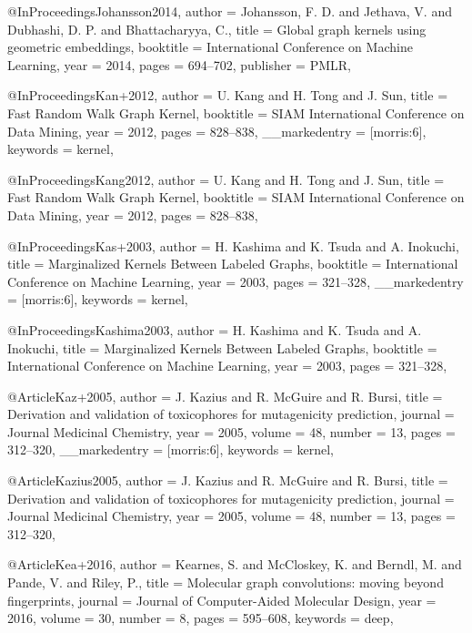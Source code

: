 @InProceedings{Johansson2014,
  author    = {Johansson, F. D. and Jethava, V. and Dubhashi, D. P. and Bhattacharyya, C.},
  title     = {Global graph kernels using geometric embeddings},
  booktitle = {International Conference on Machine Learning},
  year      = {2014},
  pages     = {694--702},
  publisher = {PMLR},
}

@InProceedings{Kan+2012,
  author        = {U. Kang and H. Tong and J. Sun},
  title         = {Fast Random Walk Graph Kernel},
  booktitle     = {SIAM International Conference on Data Mining},
  year          = {2012},
  pages         = {828--838},
  __markedentry = {[morris:6]},
  keywords      = {kernel},
}

@InProceedings{Kang2012,
  author    = {U. Kang and H. Tong and J. Sun},
  title     = {Fast Random Walk Graph Kernel},
  booktitle = {SIAM International Conference on Data Mining},
  year      = {2012},
  pages     = {828--838},
}

@InProceedings{Kas+2003,
  author        = {H. Kashima and K. Tsuda and A. Inokuchi},
  title         = {Marginalized Kernels Between Labeled Graphs},
  booktitle     = {International Conference on Machine Learning},
  year          = {2003},
  pages         = {321--328},
  __markedentry = {[morris:6]},
  keywords      = {kernel},
}

@InProceedings{Kashima2003,
  author    = {H. Kashima and K. Tsuda and A. Inokuchi},
  title     = {Marginalized Kernels Between Labeled Graphs},
  booktitle = {International Conference on Machine Learning},
  year      = {2003},
  pages     = {321--328},
}

@Article{Kaz+2005,
  author        = {J. Kazius and R. Mc{G}uire and R. Bursi},
  title         = {Derivation and validation of toxicophores for mutagenicity prediction},
  journal       = {Journal Medicinal Chemistry},
  year          = {2005},
  volume        = {48},
  number        = {13},
  pages         = {312--320},
  __markedentry = {[morris:6]},
  keywords      = {kernel},
}

@Article{Kazius2005,
  author  = {J. Kazius and R. Mc{G}uire and R. Bursi},
  title   = {Derivation and validation of toxicophores for mutagenicity prediction},
  journal = {Journal Medicinal Chemistry},
  year    = {2005},
  volume  = {48},
  number  = {13},
  pages   = {312--320},
}

@Article{Kea+2016,
  author   = {Kearnes, S. and McCloskey, K. and Berndl, M. and Pande, V. and Riley, P.},
  title    = {Molecular graph convolutions: moving beyond fingerprints},
  journal  = {Journal of Computer-Aided Molecular Design},
  year     = {2016},
  volume   = {30},
  number   = {8},
  pages    = {595--608},
  keywords = {deep},
}

